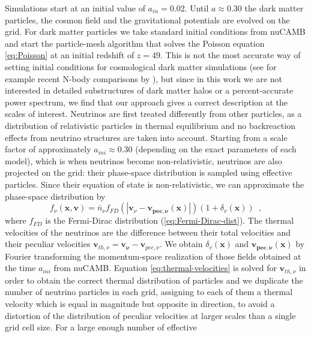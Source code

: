 \normalsize

Simulations start at an initial value of $a_{in}=0.02$. Until $a\approx0.30$
the dark matter particles, the cosmon field and the gravitational
potentials are evolved on the grid. For dark matter particles we take
standard initial conditions from nuCAMB and start the particle-mesh
algorithm that solves the Poisson equation \ref{eq:Poisson}
at an initial redshift of $z=49$. This is not the most accurate way
of setting initial conditions for cosmological dark matter simulations
(see for example recent N-body comparisons by \cite{schneider_matter_2016}),
but since in this work we are not interested in detailed substructures
of dark matter halos or a percent-accurate power spectrum, we find
that our approach gives a correct description at the scales of interest.
Neutrinos are first treated differently from other particles, as a
distribution of relativistic particles in thermal equilibrium and
no backreaction effects from neutrino structures are taken into account.
Starting from a scale factor of approximately $a_{ini}\approx0.30$
(depending on the exact parameters of each model), which is when neutrinos
become non-relativistic, neutrinos are also projected on the grid:
their phase-space distribution is sampled using effective particles.
Since their equation of state is non-relativistic, we can approximate
the phase-space distribution by 
\begin{equation}
f_{\nu}(\mathbf{x},\mathbf{v})=\bar{n}_{\nu}f_{FD}(|\mathbf{v}_{\nu}-\mathbf{v_{pec\mathbf{,}\nu}}(\mathbf{x})|)(1+\delta_{v}(\mathbf{x}))\,\,\,,
\label{eq:thermal-velocities}
\end{equation}
where $f_{FD}$ is the Fermi-Dirac distribution (\ref{eq:Fermi-Dirac-dist}).
The thermal velocities of the neutrinos are the difference between
their total velocities and their peculiar velocities $\mathbf{v}_{th,\nu}=\mathbf{v_{\nu}}-\mathbf{v}_{pec,\nu}$.
We obtain $\delta_{v}(\mathbf{x})$ and $\mathbf{v_{pec\mathbf{,}\nu}}(\mathbf{x})$
by Fourier transforming the momentum-space realization of those fields
obtained at the time $a_{ini}$ from nuCAMB. Equation \ref{eq:thermal-velocities}
is solved for $\mathbf{v}_{th,\nu}$ in order to obtain the correct
thermal distribution of particles and we duplicate the number of neutrino
particles in each grid, assigning to each of them a thermal velocity
which is equal in magnitude but opposite in direction, to avoid a
distortion of the distribution of peculiar velocities at larger scales
than a single grid cell size. For a large enough number of effective

